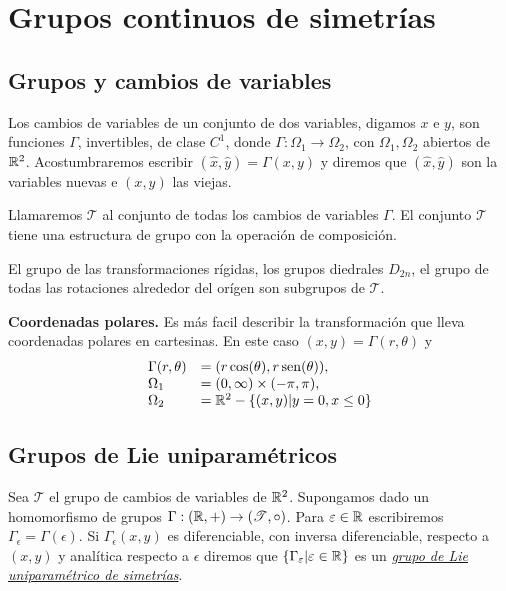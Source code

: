 \section{Grupos continuos de simetrías}

\subsection{Grupos y cambios de variables}

Los cambios de variables de un conjunto de dos variables, digamos $x$ e $y$, son funciones $\Gamma$, invertibles,  de clase $C^1$, donde $\Gamma:\Omega_1\to\Omega_2$, con $\Omega_1,\Omega_2$ abiertos de $\mathbb{R}^2$.  Acostumbraremos escribir $(\hat{x},\hat{y})=\Gamma(x,y)$ y diremos que $(\hat{x},\hat{y})$ son la variables nuevas e $(x,y)$ las viejas.

 Llamaremos $\mathscr{T}$ al conjunto de todas los cambios de variables $\Gamma$.
El conjunto  $\mathscr{T}$ tiene una estructura de grupo con la operación de composición.

 El grupo de las transformaciones rígidas, los grupos diedrales $D_{2n}$, el grupo de todas las rotaciones alrededor del orígen son subgrupos de  $\mathscr{T}$.




 \begin{ejemplo} \textbf{Coordenadas polares.} Es más facil describir la transformación que lleva coordenadas polares en cartesinas. En este caso $(x,y)=\Gamma(r,\theta)$ y
\[
\begin{array}{ll}
\Gamma(r,\theta)&=(r\cos(\theta),r\operatorname{sen}(\theta)),\\
\Omega_1&=(0,\infty)\times (-\pi,\pi),\\
\Omega_2&=\mathbb{R}^2-\{(x,y)|y=0,x\leq 0\}\\
\end{array}
\]

 \end{ejemplo}

\subsection{Grupos de Lie uniparamétricos}

\begin{definicion}
Sea $\mathscr{T}$ el grupo de cambios de variables de $\mathbb{R}^2$. Supongamos dado un homomorfismo de grupos $\Gamma:(\mathbb{R},+)\to (\mathscr{T},\circ)$.  Para $\varepsilon\in\mathbb{R}$ escribiremos $\Gamma_{\epsilon}=\Gamma(\epsilon)$.  Si $\Gamma_{\epsilon}(x,y)$ es diferenciable, con inversa diferenciable, respecto a $(x,y)$ y analítica respecto a $\epsilon$ diremos que $\{\Gamma_{\varepsilon}|\varepsilon\in\mathbb{R}\}$ es un \href{http://es.wikipedia.org/wiki/Grupo_uniparamétrico}{\emph{grupo de Lie uniparamétrico de simetrías}}.
\end{definicion}


